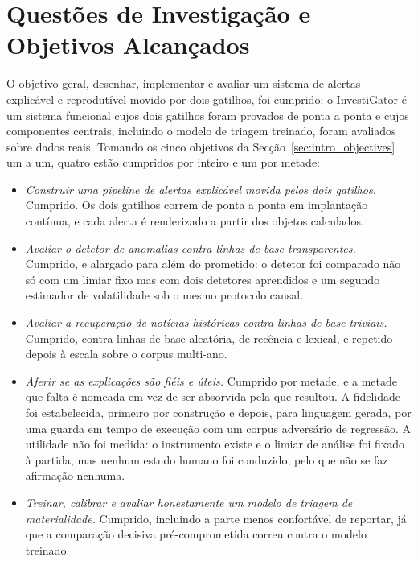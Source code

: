 \section{Questões de Investigação e Objetivos Alcançados}
\label{sec:concl_objectives}

O objetivo geral, desenhar, implementar e avaliar um sistema de alertas explicável e reprodutível
movido por dois gatilhos, foi cumprido: o InvestiGator é um sistema funcional cujos dois gatilhos
foram provados de ponta a ponta e cujos componentes centrais, incluindo o modelo de triagem treinado,
foram avaliados sobre dados reais. Tomando os cinco objetivos da
Secção~\ref{sec:intro_objectives} um a um, quatro estão cumpridos por inteiro e um por metade:

\begin{itemize}
  \item \emph{Construir uma pipeline de alertas explicável movida pelos dois gatilhos.} Cumprido. Os
        dois gatilhos correm de ponta a ponta em implantação contínua, e cada alerta é renderizado a
        partir dos objetos calculados.
  \item \emph{Avaliar o detetor de anomalias contra linhas de base transparentes.} Cumprido, e alargado
        para além do prometido: o detetor foi comparado não só com um limiar fixo mas com dois
        detetores aprendidos e um segundo estimador de volatilidade sob o mesmo protocolo causal.
  \item \emph{Avaliar a recuperação de notícias históricas contra linhas de base triviais.} Cumprido,
        contra linhas de base aleatória, de recência e lexical, e repetido depois à escala sobre o
        corpus multi-ano.
  \item \emph{Aferir se as explicações são fiéis e úteis.} Cumprido por metade, e a metade que falta é
        nomeada em vez de ser absorvida pela que resultou. A fidelidade foi estabelecida, primeiro por
        construção e depois, para linguagem gerada, por uma guarda em tempo de execução com um corpus
        adversário de regressão. A utilidade não foi medida: o instrumento existe e o limiar de análise
        foi fixado à partida, mas nenhum estudo humano foi conduzido, pelo que não se faz afirmação
        nenhuma.
  \item \emph{Treinar, calibrar e avaliar honestamente um modelo de triagem de materialidade.}
        Cumprido, incluindo a parte menos confortável de reportar, já que a comparação decisiva
        pré-comprometida correu contra o modelo treinado.
\end{itemize}

